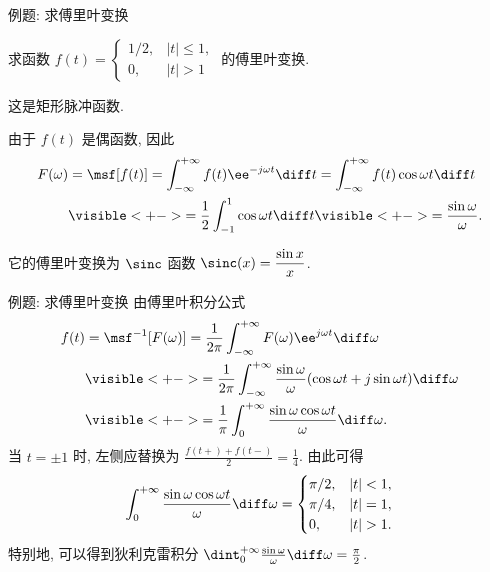 \begin{frame}{例题: 求傅里叶变换}
	\onslide<+->
	\begin{example}
		求函数 $f(t)=
			\begin{cases}
				1/2, & |t|\le 1,\\
				0, & |t|>1
			\end{cases}$
		的傅里叶变换.
	\end{example}
	\onslide<+->
	这是矩形脉冲函数.
	\onslide<+->
	\begin{solution}
		由于 $f(t)$ 是偶函数, 因此
		\begin{align*}
			F(\omega)&=\msf[f(t)]
			=\int_{-\infty}^{+\infty}f(t)\ee^{-j\omega t}\diff t
			=\int_{-\infty}^{+\infty}f(t)\cos{\omega t}\diff t\\
			&\visible<+->{=\frac12\int_{-1}^1\cos{\omega t}\diff t}
				\visible<+->{=\frac{\sin \omega}{\omega}.}
		\end{align*}
	\end{solution}
	\onslide<+->
	它的傅里叶变换为 $\sinc$ 函数 $\sinc(x)=\dfrac{\sin x}x$.
\end{frame}


\begin{frame}{例题: 求傅里叶变换}
	\onslide<+->
	由傅里叶积分公式
	\begin{align*}
		f(t)&=\msf^{-1}[F(\omega)]=\frac1{2\pi}\int_{-\infty}^{+\infty}F(\omega)\ee^{j\omega t}\diff\omega\\
		&\visible<+->{=\frac1{2\pi}\int_{-\infty}^{+\infty}\frac{\sin\omega}{\omega}(\cos\omega t+j\sin\omega t)\diff \omega}\\
		&\visible<+->{=\frac1\pi\int_0^{+\infty}\frac{\sin\omega\cos\omega t}{\omega}\diff \omega.}
	\end{align*}
	\onslide<+->
	当 $t=\pm1$ 时, 左侧应替换为 $\frac{f(t+)+f(t-)}2=\frac14$.
	\onslide<+->
	由此可得
	\[\int_0^{+\infty}\frac{\sin \omega\cos\omega t}\omega\diff\omega=\begin{cases}
		\pi/2,&|t|<1,\\
		\pi/4,&|t|=1,\\
		0,&|t|>1.
	\end{cases}
	\]
	\onslide<+->
	特别地, 可以得到狄利克雷积分
	$\dint_0^{+\infty}\frac{\sin\omega}\omega\diff\omega=\frac\pi2$.
\end{frame}


